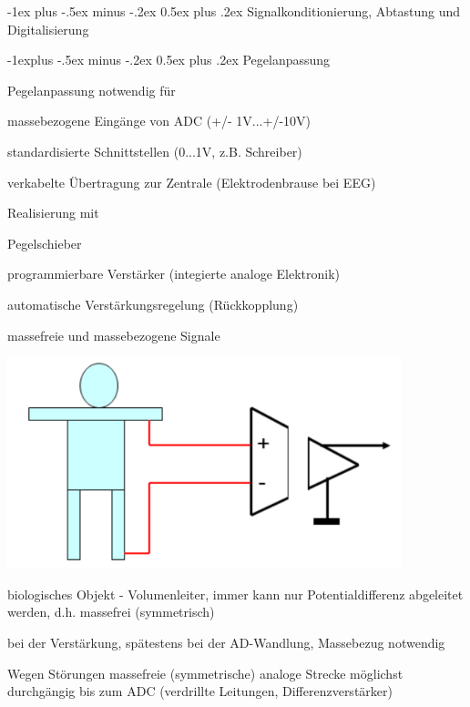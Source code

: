 \documentclass[a4paper]{article}
\makeatletter
\renewcommand{\section}{\@startsection{section}{1}{0mm}%
 {-1ex plus -.5ex minus -.2ex}%
 {0.5ex plus .2ex}%
 {\normalfont\large\bfseries}}
\renewcommand{\subsection}{\@startsection{subsection}{2}{0mm}%
 {-1explus -.5ex minus -.2ex}%
 {0.5ex plus .2ex}%
 {\normalfont\normalsize\bfseries}}
\makeatother
\begin{document}
\begin{multicols}{3}
  \section{Signalkonditionierung, Abtastung und Digitalisierung}\label{signalkonditionierung-abtastung-und-digitalisierung}

  \subsection{Pegelanpassung}\label{pegelanpassung}

  Pegelanpassung notwendig für

  \begin{itemize*}
    \item massebezogene Eingänge von ADC (+/- 1V...+/-10V)
    \item standardisierte Schnittstellen (0...1V, z.B. Schreiber)
    \item verkabelte Übertragung zur Zentrale (Elektrodenbrause bei EEG)
  \end{itemize*}

  Realisierung mit

  \begin{itemize*}
    \item Pegelschieber
    \item programmierbare Verstärker (integierte analoge Elektronik)
    \item automatische Verstärkungsregelung (Rückkopplung)
  \end{itemize*}

  massefreie und massebezogene Signale

  \begin{itemize*}
    \item \includegraphics[width=.5\linewidth]{Assets/Biosignalverarbeitung-pegelanpassung.png}
    \item biologisches Objekt - Volumenleiter, immer kann nur Potentialdifferenz abgeleitet werden, d.h. massefrei (symmetrisch)
    \item bei der Verstärkung, spätestens bei der AD-Wandlung, Massebezug notwendig
    \item Wegen Störungen massefreie (symmetrische) analoge Strecke möglichst durchgängig bis zum ADC (verdrillte Leitungen, Differenzverstärker)
  \end{itemize*}


\end{multicols}
\end{document}
